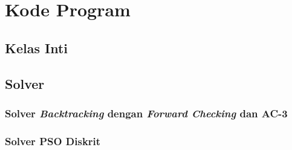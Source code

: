 \chapter{Kode Program}
\label{lamp:A}

\section{Kelas Inti}
\label{lampiran:core}











\section{Solver}
\label{lampiran:solver}

\subsection{Solver \textit{Backtracking} dengan \textit{Forward Checking} dan AC-3}
\label{lampiran:backtracking-solver}



\subsection{Solver PSO Diskrit}
\label{lampiran:pso-solver}



